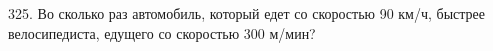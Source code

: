 325. Во сколько раз автомобиль, который едет со скоростью 90 км/ч, быстрее велосипедиста, едущего со скоростью 300 м/мин?\\

